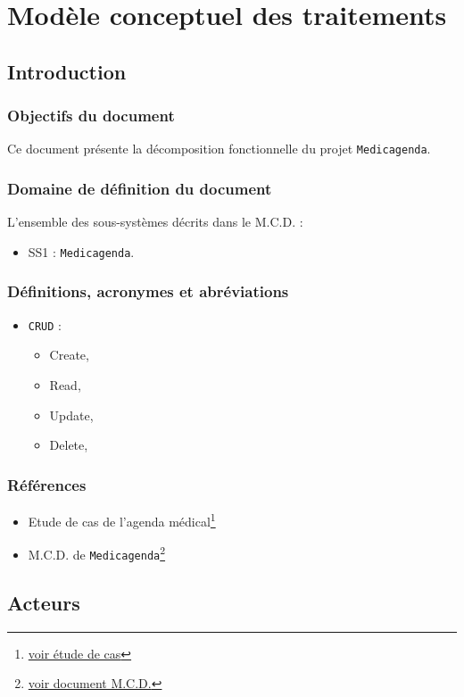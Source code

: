 \chapter{Modèle conceptuel des traitements}

\section{Introduction}

\subsection{Objectifs du document}
Ce document présente la décomposition fonctionnelle du projet \texttt{Medicagenda}.
\subsection{Domaine de définition du document}
L'ensemble des sous-systèmes décrits dans le M.C.D. :
\begin{itemize}
	\item SS1 : \texttt{Medicagenda}.
\end{itemize}
\subsection{Définitions, acronymes et abréviations}
\begin{itemize}
	\item \texttt{CRUD} :
		\begin{itemize}
			\item[] Create,
			\item[] Read,
			\item[] Update,
			\item[] Delete,
		\end{itemize}
\end{itemize}
\subsection{Références}
\begin{itemize}
	\item[] Etude de cas de l'agenda
		médical\footnote{\href{../Enonce_Travail_Synthese_14-15.pdf}{voir
		étude de cas}}
	\item[] M.C.D. de \texttt{Medicagenda}\footnote{\href{../MCD/MCD.pdf}{voir document M.C.D.}}
\end{itemize}
\newpage
\section{Acteurs}
